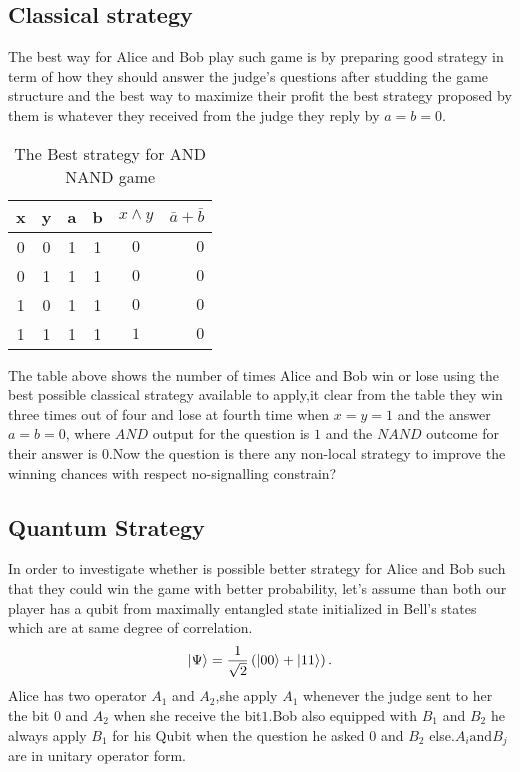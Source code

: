 \subsection{Classical strategy} 
The best way for Alice and Bob play such game is by preparing good strategy in term of how they should answer the judge's questions after studding the game structure and the best way to maximize their profit the best  strategy proposed by them is whatever they received  from the  judge they reply by $a=b=0$.

\begin {table}[htp]
\begin{center}
\begin{tabular}{ |c|c|c|c|c r| }
  \hline
  x & y & a & b &  $x \wedge y $ & $\bar{a}+\bar{b}$\\
  \hline 
  0 & 0 & 1 & 1 &$0$  & $0$\\
  \hline
  0 &1 & 1 & 1 &$0$  & $0$\\
  \hline
   1 & 0 & 1 & 1 &$0$ &  $0$\\
  \hline
  1 & 1 & 1 & 1 &$1$  & $0$\\
  \hline
\end{tabular}
\caption {The Best strategy for AND NAND game}
\end{center}
\end{table}

The table above shows the number of times Alice and Bob win or lose using the best possible  classical strategy available to apply,it clear from the table they win three times out of four and lose at fourth time when $x=y=1$ and the answer $a=b=0$, where $AND$ output for the question is $1$ and the $NAND$ outcome for their answer is $0$.Now the question is there any non-local  strategy  to improve the winning chances with respect no-signalling constrain?

\subsection{Quantum Strategy}
In order to investigate whether is possible better strategy for Alice and Bob such that they could  win the game with better probability, let's assume  than both our player has a qubit from maximally  entangled state initialized in Bell's states which are  at same degree of correlation.
\begin{equation}
\ket{\Psi }= \frac{1}{\sqrt{2}}\left( \ket{00} +\ket{11} \right)\label{EQ:1} .
\end{equation}
Alice has two operator $A_1$ and $A_2$,she apply $A_1$ whenever the judge sent to her the bit $0$ and $A_2$ when she receive the bit$1$.Bob also equipped with $B_1$ and $B_2$ he always apply $B_1$ for his Qubit when the question he asked $0$ and $B_2$ else.$A_i \text{and} B_j$ are in unitary operator form.

